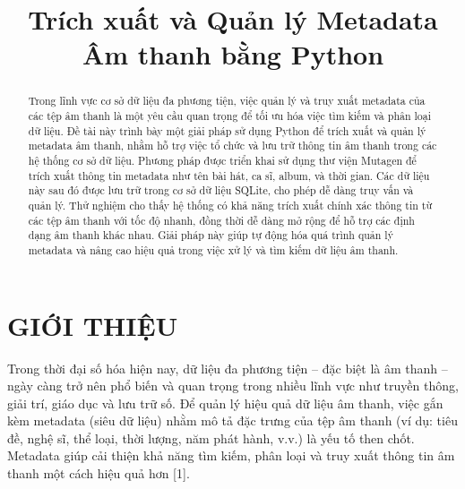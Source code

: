 \documentclass[conference]{IEEEtran}
\begin{document}
\title{Trích xuất và Quản lý Metadata Âm thanh bằng Python}

\author{
}

\maketitle

\begin{abstract}
Trong lĩnh vực cơ sở dữ liệu đa phương tiện, việc quản lý và truy xuất metadata của các tệp âm thanh là một yêu cầu quan trọng để tối ưu hóa việc tìm kiếm và phân loại dữ liệu. Đề tài này trình bày một giải pháp sử dụng Python để trích xuất và quản lý metadata âm thanh, nhằm hỗ trợ việc tổ chức và lưu trữ thông tin âm thanh trong các hệ thống cơ sở dữ liệu. Phương pháp được triển khai sử dụng thư viện Mutagen để trích xuất thông tin metadata như tên bài hát, ca sĩ, album, và thời gian. Các dữ liệu này sau đó được lưu trữ trong cơ sở dữ liệu SQLite, cho phép dễ dàng truy vấn và quản lý. Thử nghiệm cho thấy hệ thống có khả năng trích xuất chính xác thông tin từ các tệp âm thanh với tốc độ nhanh, đồng thời dễ dàng mở rộng để hỗ trợ các định dạng âm thanh khác nhau. Giải pháp này giúp tự động hóa quá trình quản lý metadata và nâng cao hiệu quả trong việc xử lý và tìm kiếm dữ liệu âm thanh.
\end{abstract}


\section{GIỚI THIỆU}
Trong thời đại số hóa hiện nay, dữ liệu đa phương tiện – đặc biệt là âm thanh – ngày càng trở nên phổ biến và quan trọng trong nhiều lĩnh vực như truyền thông, giải trí, giáo dục và lưu trữ số. Để quản lý hiệu quả dữ liệu âm thanh, việc gắn kèm metadata (siêu dữ liệu) nhằm mô tả đặc trưng của tệp âm thanh (ví dụ: tiêu đề, nghệ sĩ, thể loại, thời lượng, năm phát hành, v.v.) là yếu tố then chốt. Metadata giúp cải thiện khả năng tìm kiếm, phân loại và truy xuất thông tin âm thanh một cách hiệu quả hơn [1].
\end{document}
